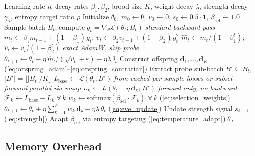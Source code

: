 \documentclass[12pt]{article}
\newcommand{\Loss}{\mathcal{L}}
\newcommand{\softmax}{\mathrm{softmax}}
\begin{document}
\begin{algorithm}[H]
\caption{EVE: Evolutionary Virtual Exploration.}
\label{alg:eve}
\begin{algorithmic}[1]
\Require Learning rate $\eta$, decay rates $\beta_1, \beta_2$,
  brood size $K$, weight decay $\lambda$, strength decay $\gamma_s$,
  entropy target ratio $\rho$
\State Initialize $\theta_0$, $m_0 \leftarrow 0$, $v_0 \leftarrow 0$,
  $s_0 \leftarrow 0.5 \cdot \mathbf{1}$,
  $\beta_{\mathrm{sel}} \leftarrow 1.0$
  \State Sample batch $B_t$; compute $g_t = \nabla_\theta
    \Loss(\theta_t; B_t)$
    \hfill {\color{graytext}\textit{standard backward pass}}
  \State $m_t \leftarrow \beta_1 m_{t-1} + (1 - \beta_1)\,g_t$;
    \quad $v_t \leftarrow \beta_2 v_{t-1} + (1 - \beta_2)\,g_t^2$
  \State $\hat{m}_t \leftarrow m_t / (1 - \beta_1^t)$;
    \quad $\hat{v}_t \leftarrow v_t / (1 - \beta_2^t)$
   \hfill {\color{graytext}\textit{exact AdamW, skip probe}}
    \State $\theta_{t+1} \leftarrow \theta_t
      - \eta\,\hat{m}_t / (\sqrt{\hat{v}_t} + \varepsilon)
      - \eta\lambda\,\theta_t$
  \Else
    \State Construct offspring $\mathbf{d}_1, \ldots, \mathbf{d}_K$
      \hfill (\cref{eq:offspring_adam}--\cref{eq:offspring_contrarian})
    \State Extract probe sub-batch $B' \subseteq B_t$,
      $|B'| = \lfloor |B_t|/K \rfloor$
    \State $L_{\mathrm{base}} \leftarrow \Loss(\theta_t; B')$
      \hfill {\color{graytext}\textit{from cached per-sample losses or
      subset forward}}
      \hfill {\color{graytext}\textit{parallel via vmap}}
      \State $L_k \leftarrow \Loss(\theta_t + \eta\,\mathbf{d}_k;\, B')$
        \hfill {\color{graytext}\textit{forward only, no backward}}
    \EndFor
    \State $\mathcal{F}_k \leftarrow L_{\mathrm{base}} - L_k$
      \quad $\forall\,k$
    \State $w_k \leftarrow \softmax(\beta_{\mathrm{sel}} \cdot
      \mathcal{F}_k)$ \quad $\forall\,k$
      \hfill (\cref{eq:selection_weights})
    \State $\theta_{t+1} \leftarrow \theta_t
      + \eta \sum_{k=1}^K w_k\,\mathbf{d}_k
      - \eta\lambda\,\theta_t$
      \hfill (\cref{eq:eve_update})
  \EndIf
  \State Update strength signal $s_{t+1}$
    \hfill (\cref{eq:strength})
  \State Adapt $\beta_{\mathrm{sel}}$ via entropy targeting
    \hfill (\cref{eq:temperature_adapt})
\EndFor
\State \Return $\theta_T$
\end{algorithmic}
\end{algorithm}

\subsection{Memory Overhead}
\end{document}
